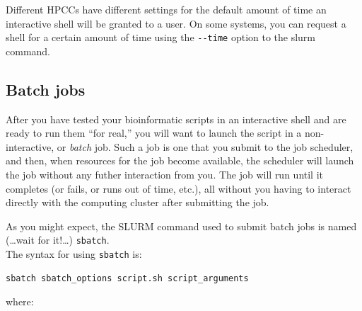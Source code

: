 \documentclass[]{krantz}
\begin{document}
Different HPCCs have different settings for the default amount of time an interactive shell will be
granted to a user. On some systems, you can request a shell for a certain amount of time using the
\texttt{-\/-time} option to the slurm command.

\hypertarget{batch-jobs}{%
\subsection{Batch jobs}\label{batch-jobs}}

After you have tested your bioinformatic scripts in an interactive shell and are ready to
run them ``for real,'' you will want to launch the script in a non-interactive, or \emph{batch} job.
Such a job is one that you submit to the job scheduler, and then, when resources for the job become available,
the scheduler will launch the job without any futher interaction from you. The job will run until
it completes (or fails, or runs out of time, etc.), all without you having to interact directly
with the computing cluster after submitting the job.

As you might expect, the SLURM command used to submit batch jobs is named (\ldots{}wait for it!\ldots{}) \texttt{sbatch}.\\
The syntax for using \texttt{sbatch} is:

\begin{verbatim}
sbatch sbatch_options script.sh script_arguments
\end{verbatim}

where:
\end{document}
